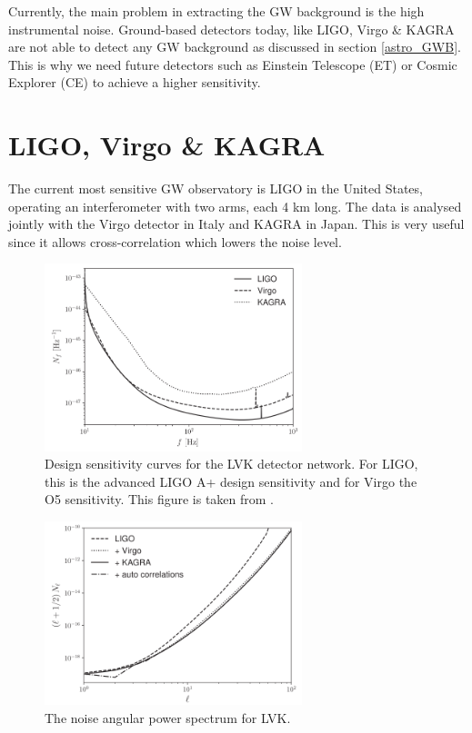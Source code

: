 Currently, the main problem in extracting the GW background is the high instrumental noise. Ground-based detectors today, like LIGO, Virgo \& KAGRA are not able to detect any GW background as discussed in section \ref{astro_GWB}. This is why we need future detectors such as Einstein Telescope (ET) or Cosmic Explorer (CE) to achieve a higher sensitivity.

\section{LIGO, Virgo \& KAGRA}

The current most sensitive GW observatory is LIGO in the United States, operating an interferometer with two arms, each 4 km long. The data is analysed jointly with the Virgo detector in Italy and KAGRA in Japan. This is very useful since it allows cross-correlation which lowers the noise level.

\begin{figure}[h]
    \centering
    \includegraphics[width=7.5cm]{Images/lvk_frequency_noise.png}
    \caption[Noise sensitivity with respect to frequency for LVK.]{Design sensitivity curves for the LVK detector network. For LIGO, this is the advanced LIGO A+ design sensitivity and for Virgo the O5 sensitivity. This figure is taken from \cite{alonso_noise_2020}.}
    \label{lvk_frequency}
\end{figure}

\begin{figure}[h]
    \centering
        \includegraphics[width=7.5cm]{Images/alonso_ligo_noise.png}
    \caption{The noise angular power spectrum for LVK.}
    \label{lvk_Cl}
\end{figure} 

